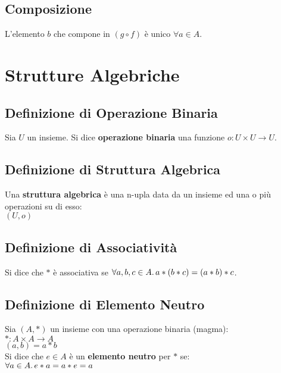 \documentclass[a4paper, twoside, italian, 11pt]{book}
\begin{document}
\subsection{Composizione}

L'elemento $b$ che compone in $(g \circ f)$ è unico $\forall a \in A$.



\section{Strutture Algebriche}


\subsection{Definizione di Operazione Binaria}

Sia $U$ un insieme. Si dice \textbf{operazione binaria} una funzione $o : U \times U \rightarrow U$.


\subsection{Definizione di Struttura Algebrica}

Una \textbf{struttura algebrica} è una n-upla data da un insieme ed una o più operazioni su di esso: \\

$(U, o)$


\subsection{Definizione di Associatività}

Si dice che $*$ è associativa se $\forall a,b,c \in A \ldotp a * (b * c) = (a * b) * c$.


\subsection{Definizione di Elemento Neutro}

Sia $(A, *)$ un insieme con una operazione binaria (magma): \\

$* : A \times A \rightarrow A$ \\
\indent
$(a, b) = a * b$ \\

\noindent
Si dice che $e \in A$ è un \textbf{elemento neutro} per $*$ se: \\

$\forall a \in A \ldotp e * a = a * e = a$
\end{document}
